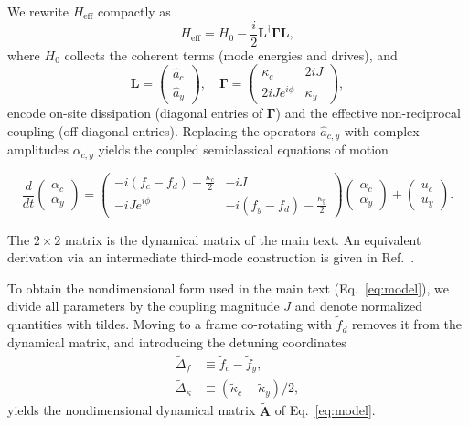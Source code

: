 \documentclass[%
  reprint,
  amsmath,amssymb,
  aps,
  prapplied,
  superscriptaddress,
  longbibliography]{revtex4-2}
\begin{document}
We rewrite $H_{\text{eff}}$ compactly as
\begin{equation}\label{eq:dissipator}
H_{\text{eff}} = H_0 - \frac{i}{2} \mathbf{L}^\dagger \boldsymbol{\Gamma} \mathbf{L},
\end{equation}
where $H_0$ collects the coherent terms (mode energies and drives), and
\begin{equation}
\mathbf{L} = \begin{pmatrix} \hat{a}_c \\ \hat{a}_y \end{pmatrix}, \quad
\boldsymbol{\Gamma} = \begin{pmatrix} \kappa_c & 2iJ \\ 2iJ e^{i\phi} & \kappa_y \end{pmatrix},
\end{equation}
encode on-site dissipation (diagonal entries of $\boldsymbol{\Gamma}$) and the effective non-reciprocal coupling (off-diagonal entries). Replacing the operators $\hat{a}_{c,y}$ with complex amplitudes $\alpha_{c,y}$ yields the coupled semiclassical equations of motion
\begin{widetext}
\begin{equation}\label{eq:alphas}
\frac{d}{dt}
\begin{pmatrix} \alpha_c \\ \alpha_y \end{pmatrix}
=
\begin{pmatrix}
-i(f_c - f_d) - \frac{\kappa_c}{2} & -iJ \\
-iJ e^{i\phi} & -i(f_y - f_d) - \frac{\kappa_y}{2}
\end{pmatrix}
\begin{pmatrix} \alpha_c \\ \alpha_y \end{pmatrix}
+
\begin{pmatrix} u_c \\ u_y \end{pmatrix}.
\end{equation}
\end{widetext}
The $2 \times 2$ matrix is the dynamical matrix of the main text. An equivalent derivation via an intermediate third-mode construction is given in Ref.~\cite{rohn_classical_2023}.

To obtain the nondimensional form used in the main text (Eq.~\ref{eq:model}), we divide all parameters by the coupling magnitude $J$ and denote normalized quantities with tildes. Moving to a frame co-rotating with $\tilde{f}_d$ removes it from the dynamical matrix, and introducing the detuning coordinates
\begin{align}
\tilde{\Delta}_f &\equiv \tilde{f}_c - \tilde{f}_y, \\
\tilde{\Delta}_\kappa &\equiv (\tilde{\kappa}_c - \tilde{\kappa}_y)/2,
\end{align}
yields the nondimensional dynamical matrix $\tilde{\boldsymbol{A}}$ of Eq.~\ref{eq:model}.
\end{document}
